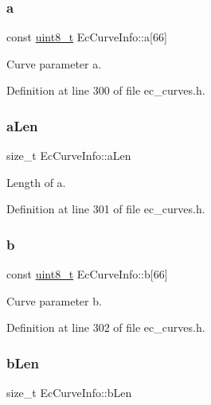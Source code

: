 \subsubsection{\texorpdfstring{a}{a}}
{\footnotesize\ttfamily const \hyperlink{stdint_8h_aba7bc1797add20fe3efdf37ced1182c5}{uint8\+\_\+t} Ec\+Curve\+Info\+::a\mbox{[}66\mbox{]}}



Curve parameter a. 



Definition at line 300 of file ec\+\_\+curves.\+h.

\mbox{\label{structEcCurveInfo_a24c49b1312a87d743b431a9bcd034a82}} 
\subsubsection{\texorpdfstring{a\+Len}{aLen}}
{\footnotesize\ttfamily size\+\_\+t Ec\+Curve\+Info\+::a\+Len}



Length of a. 



Definition at line 301 of file ec\+\_\+curves.\+h.

\mbox{\label{structEcCurveInfo_a1ccd0b43cdda7f8796588bcd4c8667ce}} 
\subsubsection{\texorpdfstring{b}{b}}
{\footnotesize\ttfamily const \hyperlink{stdint_8h_aba7bc1797add20fe3efdf37ced1182c5}{uint8\+\_\+t} Ec\+Curve\+Info\+::b\mbox{[}66\mbox{]}}



Curve parameter b. 



Definition at line 302 of file ec\+\_\+curves.\+h.

\mbox{\label{structEcCurveInfo_a72ad006f6cca9613a1e50efe29191cf6}} 
\subsubsection{\texorpdfstring{b\+Len}{bLen}}
{\footnotesize\ttfamily size\+\_\+t Ec\+Curve\+Info\+::b\+Len}



